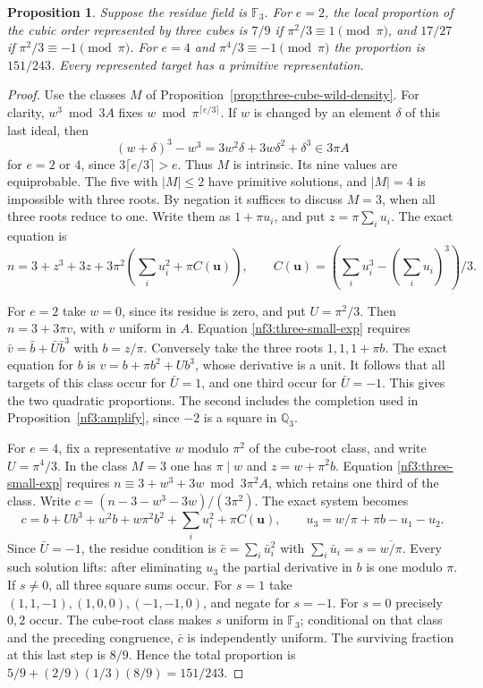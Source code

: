 \documentclass[11pt,letterpaper]{article}
\newtheorem{proposition}[proposition]{Proposition}
\theoremstyle{definition}
\numberwithin{equation}{section}
\begin{document}
\begin{proposition}\label{nf3:small-three-densities}
Suppose the residue field is $\mathbb F_3$. For $e=2$, the local
proportion of the cubic order represented by three cubes is $7/9$
if $\pi^2/3\equiv1\pmod\pi$, and $17/27$ if
$\pi^2/3\equiv-1\pmod\pi$. For $e=4$ and
$\pi^4/3\equiv-1\pmod\pi$ the proportion is $151/243$.
Every represented target has a primitive representation.
\end{proposition}
\begin{proof}
Use the classes $M$ of Proposition~\ref{prop:three-cube-wild-density}.
For clarity, $w^3\bmod3A$ fixes $w\bmod\pi^{\lceil e/3\rceil}$.
If $w$ is changed by an element $\delta$ of this last ideal, then
\[
 (w+\delta)^3-w^3=3w^2\delta+3w\delta^2+\delta^3
                      \in3\pi A
\]
for $e=2$ or $4$, since $3\lceil e/3\rceil>e$.
Thus $M$ is intrinsic. Its nine values are equiprobable. The five
with $|M|\le2$ have primitive solutions, and $|M|=4$ is impossible
with three roots. By negation it suffices to discuss $M=3$, when all
three roots reduce to one. Write them as $1+\pi u_i$, and put
$z=\pi\sum_i u_i$. The exact equation is
\begin{equation}\label{nf3:three-small-exp}
 n=3+z^3+3z+3\pi^2\left(\sum_i u_i^2+\pi C(\mathbf u)\right),
 \qquad C(\mathbf u)=
   \left(\sum_i u_i^3-\left(\sum_i u_i\right)^3\right)/3 .
\end{equation}

For $e=2$ take $w=0$, since its residue is zero, and put $U=\pi^2/3$.
Then $n=3+3\pi v$, with $v$ uniform in $A$. Equation
\eqref{nf3:three-small-exp} requires
$\bar v=\bar b+\bar U\bar b^3$ with $b=z/\pi$.
Conversely take the three roots $1,1,1+\pi b$. The exact equation
for $b$ is $v=b+\pi b^2+Ub^3$, whose derivative is a unit.
It follows that all targets of this class occur for $\bar U=1$,
and one third occur for $\bar U=-1$. This gives the two quadratic
proportions. The second includes the completion used in
Proposition~\ref{nf3:amplify}, since $-2$ is a square in $\mathbb Q_3$.

For $e=4$, fix a representative $w$ modulo $\pi^2$ of the cube-root
class, and write $U=\pi^4/3$. In the class $M=3$ one has $\pi\mid w$
and $z=w+\pi^2 b$. Equation \eqref{nf3:three-small-exp} requires
$n\equiv3+w^3+3w\bmod 3\pi^2A$, which retains one third of the class.
Write $c=(n-3-w^3-3w)/(3\pi^2)$. The exact system becomes
\[
 c=b+Ub^3+w^2b+w\pi^2 b^2+\sum_i u_i^2+\pi C(\mathbf u),
 \qquad u_3=w/\pi+\pi b-u_1-u_2 .
\]
Since $\bar U=-1$, the residue condition is
$\bar c=\sum_i\bar u_i^2$ with $\sum_i\bar u_i=s=\overline{w/\pi}$.
Every such solution lifts: after eliminating $u_3$ the partial
derivative in $b$ is one modulo $\pi$. If $s\ne0$, all three square
sums occur. For $s=1$ take $(1,1,-1),(1,0,0),(-1,-1,0)$, and
negate for $s=-1$. For $s=0$ precisely $0,2$ occur. The cube-root
class makes $s$ uniform in $\mathbb F_3$; conditional on that class
and the preceding congruence, $\bar c$ is independently uniform.
The surviving fraction at this last step is $8/9$. Hence the
total proportion is $5/9+(2/9)(1/3)(8/9)=151/243$.
\end{proof}
\end{document}

